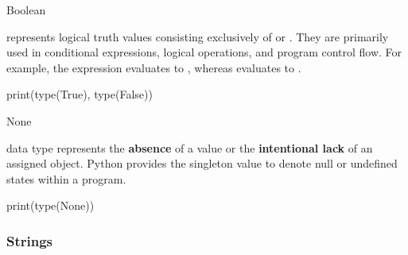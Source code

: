 \documentclass[10pt]{article}
\begin{document}
    \begin{core}[label=core:boolean]{Boolean}

       represents logical truth values consisting exclusively of  or . They are primarily used in conditional expressions, logical operations, and program control flow. For example, the expression  evaluates to , whereas  evaluates to .

      \begin{pyconsole}

        print(type(True), type(False))

      \end{pyconsole}

    \end{core}

    \begin{core}{None}

       data type represents the \textbf{absence} of a value or the \textbf{intentional lack} of an assigned object. Python provides the singleton value  to denote null or undefined states within a program. 

      \begin{pyconsole}

        print(type(None))

      \end{pyconsole}

    \end{core}

    \subsubsection{Strings}
\end{document}
